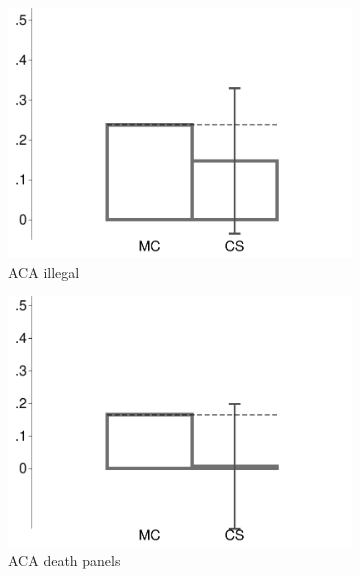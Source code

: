 \begin{figure}[t]
\begin{subfigure}{.325\textwidth}
		\includegraphics[width=\textwidth]{../figs/confidence_score_ccd_fsr_fsr_illegal_study1.pdf}
		\caption{ACA illegal}
	\end{subfigure}	
	\begin{subfigure}{.325\textwidth}\centering
		\includegraphics[width=\textwidth]{../figs/confidence_score_ccd_fsr_fsr_death_study1.pdf}
		\caption{ACA death panels}
	\end{subfigure}
	\hfill
	\begin{subfigure}{.325\textwidth}\centering

\end{subfigure}
\end{figure}
